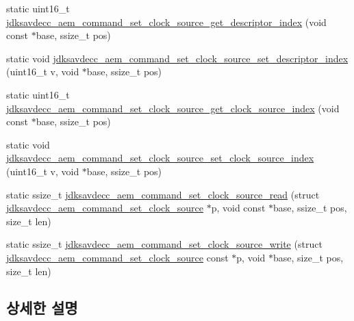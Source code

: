 \begin{DoxyCompactItemize}
\item 
static uint16\+\_\+t \hyperlink{group__command__set__clock__source_gaa76b445c2251bca11d5ea0be1ffe7174}{jdksavdecc\+\_\+aem\+\_\+command\+\_\+set\+\_\+clock\+\_\+source\+\_\+get\+\_\+descriptor\+\_\+index} (void const $\ast$base, ssize\+\_\+t pos)
\item 
static void \hyperlink{group__command__set__clock__source_ga67a23a15fd817029f1d2f9a59aba5ace}{jdksavdecc\+\_\+aem\+\_\+command\+\_\+set\+\_\+clock\+\_\+source\+\_\+set\+\_\+descriptor\+\_\+index} (uint16\+\_\+t v, void $\ast$base, ssize\+\_\+t pos)
\item 
static uint16\+\_\+t \hyperlink{group__command__set__clock__source_gad9ec123022131523546ca958ae0e7f70}{jdksavdecc\+\_\+aem\+\_\+command\+\_\+set\+\_\+clock\+\_\+source\+\_\+get\+\_\+clock\+\_\+source\+\_\+index} (void const $\ast$base, ssize\+\_\+t pos)
\item 
static void \hyperlink{group__command__set__clock__source_ga51a4d79e43ce29befb3b9a278872a19c}{jdksavdecc\+\_\+aem\+\_\+command\+\_\+set\+\_\+clock\+\_\+source\+\_\+set\+\_\+clock\+\_\+source\+\_\+index} (uint16\+\_\+t v, void $\ast$base, ssize\+\_\+t pos)
\item 
static ssize\+\_\+t \hyperlink{group__command__set__clock__source_ga9efb909cc68396f143fd82a3a078bbe4}{jdksavdecc\+\_\+aem\+\_\+command\+\_\+set\+\_\+clock\+\_\+source\+\_\+read} (struct \hyperlink{structjdksavdecc__aem__command__set__clock__source}{jdksavdecc\+\_\+aem\+\_\+command\+\_\+set\+\_\+clock\+\_\+source} $\ast$p, void const $\ast$base, ssize\+\_\+t pos, size\+\_\+t len)
\item 
static ssize\+\_\+t \hyperlink{group__command__set__clock__source_ga6a1288efbaa6e519b04f94dfa3604763}{jdksavdecc\+\_\+aem\+\_\+command\+\_\+set\+\_\+clock\+\_\+source\+\_\+write} (struct \hyperlink{structjdksavdecc__aem__command__set__clock__source}{jdksavdecc\+\_\+aem\+\_\+command\+\_\+set\+\_\+clock\+\_\+source} const $\ast$p, void $\ast$base, size\+\_\+t pos, size\+\_\+t len)
\end{DoxyCompactItemize}


\subsection{상세한 설명}


